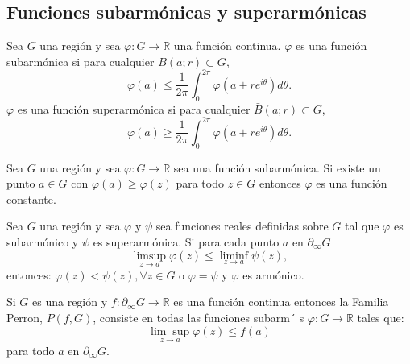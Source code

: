 \subsection{Funciones subarmónicas y superarmónicas}

\begin{definicion}
    Sea $G$ una región y sea $\varphi: G \rightarrow \mathbb{R}$ una función continua. $\varphi$ es una función subarmónica si para cualquier $\bar{B}(a ; r) \subset G$,
$$
\varphi(a) \leq \frac{1}{2 \pi} \int_0^{2 \pi} \varphi\left(a+r e^{i \theta}\right) d \theta .
$$
$\varphi$ es una función superarmónica si para cualquier $\bar{B}(a ; r) \subset G$,
$$
\varphi(a) \geq \frac{1}{2 \pi} \int_0^{2 \pi} \varphi\left(a+r e^{i \theta}\right) d \theta .
$$
\end{definicion}



\begin{teorema}
    Sea $G$ una región y sea $\varphi: G \rightarrow \mathbb{R}$ sea una función subarmónica. Si existe un punto $a\in G$ con $\varphi(a) \geq \varphi(z)$ para todo $z\in G$ entonces $\varphi$ es una función constante.
\end{teorema}


\begin{teorema}
    
 Sea $G$  una región y sea $\varphi$ y $\psi$ sea funciones reales definidas sobre $G$ tal que  $\varphi$ es subarmónico y $\psi$ es superarmónica. Si para cada punto $a$ en $\partial_{\infty} G$
$$
\limsup _{z \rightarrow a} \varphi(z) \leq \liminf _{z \rightarrow a} \psi(z),
$$
entonces:  $\varphi(z)<\psi(z),\forall z\in G$ o $\varphi=\psi$ y $\varphi$ es armónico. 
\end{teorema}

\begin{definicion}
    Si $G$ es una región y $f: \partial_{\infty} G \rightarrow \mathbb{R}$ es una función continua entonces la Familia Perron, $P(f, G)$, consiste en todas las funciones subarm´
    s $\varphi: G \rightarrow \mathbb{R}$ tales que:
$$
\underset{z \rightarrow a}{\lim \sup } \varphi(z) \leq f(a)
$$
para todo $a$ en $\partial_{\infty} G$.
\end{definicion}


